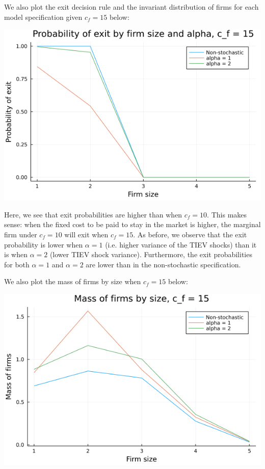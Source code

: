 \documentclass[12pt]{article}
\begin{document}
We also plot the exit decision rule and the invariant distribution of firms for each model specification given $c_f = 15$ below:
\begin{center}
    \includegraphics[scale=0.7]{exitplot15.png}
\end{center}
Here, we see that exit probabilities are higher than when $c_f = 10$. This makes sense: when the fixed cost to be paid to stay in the market is higher, the marginal firm under $c_f = 10$ will exit when $c_f = 15$. As before, we observe that the exit probability is lower when $\alpha = 1$ (i.e. higher variance of the TIEV shocks) than it is when $\alpha = 2$ (lower TIEV shock variance). Furthermore, the exit probabilities for both $\alpha=1$ and $\alpha = 2$ are lower than in the non-stochastic specification. 

We also plot the mass of firms by size when $c_f = 15$ below:
\begin{center}
    \includegraphics[scale=0.7]{muplot15.png}
\end{center}
\end{document}
